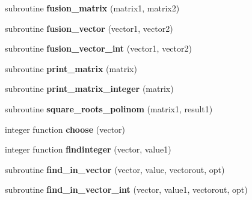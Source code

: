 \begin{DoxyCompactItemize}
\item 
\hypertarget{classcommon__functions_ae2574f7de49204ab51faac4772ddc428}{subroutine {\bfseries fusion\-\_\-matrix} (matrix1, matrix2)}\label{classcommon__functions_ae2574f7de49204ab51faac4772ddc428}

\item 
\hypertarget{classcommon__functions_a4946599ea072af8fa67c91ff007fc1aa}{subroutine {\bfseries fusion\-\_\-vector} (vector1, vector2)}\label{classcommon__functions_a4946599ea072af8fa67c91ff007fc1aa}

\item 
\hypertarget{classcommon__functions_ab20907d2d7c8e71a2e1a79cca68d385c}{subroutine {\bfseries fusion\-\_\-vector\-\_\-int} (vector1, vector2)}\label{classcommon__functions_ab20907d2d7c8e71a2e1a79cca68d385c}

\item 
\hypertarget{classcommon__functions_afbff1f3464c4f1085b57c90637d9a21b}{subroutine {\bfseries print\-\_\-matrix} (matrix)}\label{classcommon__functions_afbff1f3464c4f1085b57c90637d9a21b}

\item 
\hypertarget{classcommon__functions_a8eaaddf7f67fcd4a19c871e164092ec0}{subroutine {\bfseries print\-\_\-matrix\-\_\-integer} (matrix)}\label{classcommon__functions_a8eaaddf7f67fcd4a19c871e164092ec0}

\item 
\hypertarget{classcommon__functions_a0171def1de4eacc5b8286d86bacae52c}{subroutine {\bfseries square\-\_\-roots\-\_\-polinom} (matrix1, result1)}\label{classcommon__functions_a0171def1de4eacc5b8286d86bacae52c}

\item 
\hypertarget{classcommon__functions_acf599fb0a18720c7f380dfc805790df8}{integer function {\bfseries choose} (vector)}\label{classcommon__functions_acf599fb0a18720c7f380dfc805790df8}

\item 
\hypertarget{classcommon__functions_a0bf27440299e4d7e8e377c712962ecb3}{integer function {\bfseries findinteger} (vector, value1)}\label{classcommon__functions_a0bf27440299e4d7e8e377c712962ecb3}

\item 
\hypertarget{classcommon__functions_ae97553a79fddd4e0de9c6d1ac7e4b21f}{subroutine {\bfseries find\-\_\-in\-\_\-vector} (vector, value, vectorout, opt)}\label{classcommon__functions_ae97553a79fddd4e0de9c6d1ac7e4b21f}

\item 
\hypertarget{classcommon__functions_ae0266be4b849bd7f54d5be856ebb0faa}{subroutine {\bfseries find\-\_\-in\-\_\-vector\-\_\-int} (vector, value1, vectorout, opt)}\label{classcommon__functions_ae0266be4b849bd7f54d5be856ebb0faa}


\end{DoxyCompactItemize}
